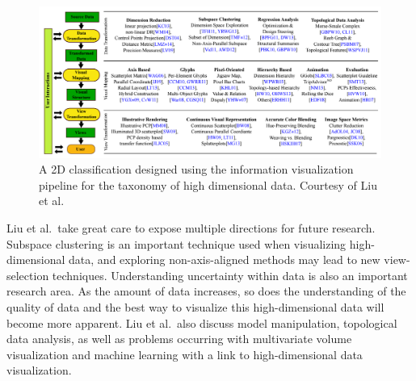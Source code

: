 \begin{figure}[t]
\begin{center}
\includegraphics[width=1\textwidth]{images/liu2015visualising.png}
\caption{A 2D classification designed using the information visualization pipeline for the taxonomy of high dimensional data. Courtesy of Liu et al.\ \cite{liu2015visualising}} \label{fig: liu2015visualising}
\end{center}
\end{figure}

%
%
%

Liu et al.\ take great care to expose multiple directions for future research. Subspace clustering is an important technique used when visualizing high-dimensional data, and exploring non-axis-aligned methods may lead to new view-selection techniques. Understanding uncertainty within data is also an important research area. As the amount of data increases, so does the understanding of the quality of data and the best way to visualize this high-dimensional data will become more apparent. Liu et al.\ also discuss model manipulation, topological data analysis, as well as problems occurring with multivariate volume visualization and machine learning with a link to high-dimensional data visualization.

